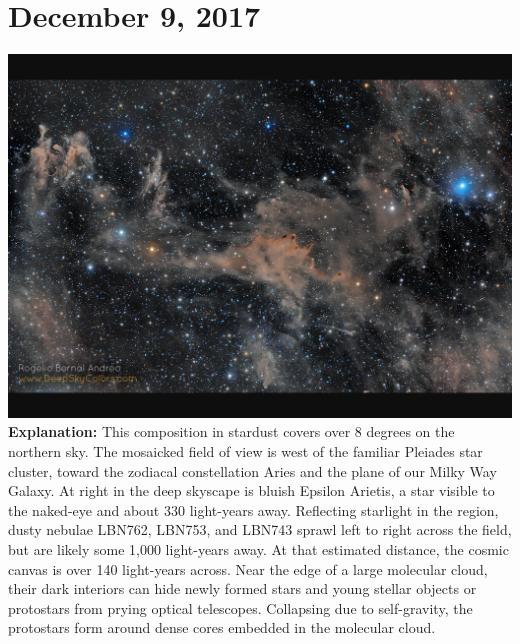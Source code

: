 \documentclass{article}%
\begin{document}
%
\normalsize%
\section*{December 9, 2017}%
\includegraphics[width=\textwidth]{../lib/pictures/171209.jpg}%
\textbf{\newline%
\newline%
Explanation:\newline%
}%
    This composition in stardust covers over 8 degrees on the northern sky.  The mosaicked field of view is west of the familiar Pleiades star cluster, toward the zodiacal constellation Aries and the plane of our Milky Way Galaxy.  At right in the deep skyscape is bluish Epsilon Arietis, a star visible to the naked{-}eye and about 330 light{-}years away.  Reflecting starlight in the region, dusty nebulae LBN762, LBN753, and LBN743 sprawl left to right across the field, but are likely some 1,000 light{-}years away.  At that estimated distance, the cosmic canvas is over 140 light{-}years across.  Near the edge of a large molecular cloud, their dark interiors can hide newly formed stars and young stellar objects or protostars from prying optical telescopes.  Collapsing due to self{-}gravity, the protostars form around dense cores embedded in the molecular cloud.%
\newpage

%
\end{document}
